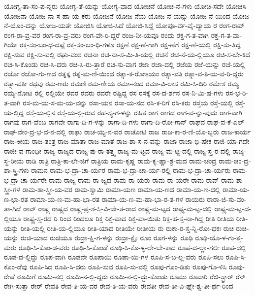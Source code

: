 {ಯೋಗ್ಯ-ತಾ-ಸಂ-ಪ-ನ್ನರು
ಯೋಗ್ಯ-ತೆ-ಯನ್ನು
ಯೋಗ್ಯ-ವಾದ
ಯೋಚನೆ
ಯೋಚ-ನೆ-ಗಳು
ಯೋಚಿ-ಸದೇ
ಯೋಚಿಸಿ
ಯೋಜನಾ
ಯೋಜ-ನಾ-ಸ-ಹಾ-ಯ-ಕರು
ಯೋಜನೆ
ಯೋಜ-ನೆಯ
ಯೋಜ-ನೆ-ಯನ್ನು
ಯೋಜ-ನೆ-ಯಿಂದ
ಯೋಜ-ನೆ-ಯೊಂ-ದನ್ನು
ಯೋಜ-ಯತೇ
ಯೋಜಿಸಿ
ಯೋಜಿ-ಸಿದೆ
ಯೋಜಿ-ಸಿದ್ದೆ
ಯೋಪೂ-ರ್ವ-ವೈ-ದ್ಯಾಯ
ರ
ರಂಗ-ರಾವ್
ರಂಗ-ರಾ-ವ್ರ-ವರ
ರಂಗ-ರಾ-ವ್ರ-ವರು
ರಂಗ-ವೇ-ರಿ-ದ್ದರೆ
ರಂಜ-ನೀ-ಯವೂ
ರಂದು
ರಕ್ತ-ಗ-ತ-ವಾಗಿ
ರಕ್ತ-ಗ-ತ-ವಾ-ಗಿಯೇ
ರಕ್ತ-ಸಂ-ಬಂ-ಧ-ದಷ್ಟೆ
ರಕ್ತ-ಸಂ-ಬಂ-ಧಿ-ಗಳೂ
ರಕ್ಷಣೆ
ರಕ್ಷ-ಣೆ-ಗಾಗಿ
ರಕ್ಷ-ಣೆಗೆ
ರಕ್ಷ-ಣೆ-ಯಲ್ಲಿ
ರಕ್ಷಿ-ಸು-ತ್ತಿದ್ದ
ರಕ್ಷಿ-ಸುವ
ರಕ್ಷಿ-ಸು-ವಲ್ಲಿ
ರಘು-ವಂಶ
ರಚನಾ
ರಚ-ನಾ-ಸ-ಮಿ-ತಿ-ಯಲ್ಲಿ
ರಚನೆ
ರಚ-ನೆ-ಯ-ಲ್ಲಿಯೂ
ರಚಿ-ಸ-ಬೇ-ಕಿದೆ
ರಚಿ-ಸಿ-ಕೊಂಡು
ರಚಿ-ಸಿ-ದರು
ರಚಿ-ಸಿ-ರು-ತ್ತಾರೆ
ರಚಿ-ಸು-ವಾಗ
ರಜಾ
ರಜಾ-ದಲ್ಲಿ
ರಜೆಯ
ರಜೆ-ಯನ್ನು
ರಜೆ-ಯಲ್ಲಿ
ರಜೋ
ರಜೋ-ಗು-ಣದ
ರತ್ನಕ್ಕ
ರತ್ನ-ಮ-ಣಿ-ಯಿಂದ
ರತ್ನಾ-ಕ-ರೋಽಯಂ
ರತ್ನಾ-ವತಿ
ರತ್ನಾ-ವ-ತಿ-ಯ-ವ-ರಿ-ದ್ದರು
ರತ್ನಾ-ವತೀ
ರಥವು
ರಮ-ಣರು
ರಮಣಿ
ರಮ-ಣೀಯ
ರಮಾ-ನಂದ
ರಮಾ-ವಿ-ಲಾಸ
ರಮಿ-ಸಿ-ದಿರಿ
ರಮೇಶ
ರಮ್ಯ
ರಮ್ಯ-ನೋಟ
ರಲ್ಲಿ
ರಲ್ಲಿಯೇ
ರವರ
ರವರು
ರವರೇ
ರಷ್ಟಿದ್ದ
ರಸ
ರಸಕ್ಕೆ
ರಸ-ದ-ರ್ಶನ
ರಸ-ನಿ-ಮಿ-ಷ-ಗಳು
ರಸ-ಭ-ರಿ-ತ-ವಾಗಿ
ರಸ-ಮ-ಯ-ಸ-ಮ-ಯ-ವನ್ನು
ರಸಾ-ಯನ
ರಸಾ-ಯ-ನದ
ರಸಿ-ಕ-ರಿಗೆ
ರಸಿ-ಕರು
ರಸ್ತೆಯ
ರಸ್ತೆ-ಯಲ್ಲಿ
ರಸ್ತೆ-ಯ-ಲ್ಲಿದ್ದ
ರಸ್ತೆ-ಯ-ಲ್ಲಿನ
ರಸ್ತೆ-ಯ-ಲ್ಲಿ-ರುವ
ರಹ-ಸ್ಯ-ಗ-ಳನ್ನು
ರಹಿತ
ರಾಗ
ರಾಗದ
ರಾಗ-ವ-ನ್ನು-ವುದು
ರಾಗ-ವಾಗಿ
ರಾಗವು
ರಾಗ-ವೆಂಬ
ರಾಗವೇ
ರಾಗಾ-ದಿ-ಗ-ಳನ್ನು
ರಾಗಾ-ದಿ-ಗಳು
ರಾಗಾ-ದಿ-ರೋ-ಗಾನ್
ರಾಘವ
ರಾಘ-ವ-ಕೆ-ಎಲ್
ರಾಘ-ವೇಂ-ದ್ರ-ಭ-ವ-ನ-ದಲ್ಲಿ
ರಾಘು
ರಾಚ-ಯ್ಯ-ನ-ವರ
ರಾಚೋಟಿ
ರಾಜ
ರಾಜ-ಕಾ-ರ-ಣಿ-ಯೊ-ಬ್ಬರು
ರಾಜ-ಕಾರ್ಯ
ರಾಜ-ಕೀಯ
ರಾಜ-ತಂತ್ರ
ರಾಜ-ಮಾತಾ
ರಾಜ-ಮಾತೆ
ರಾಜ-ಶಾ-ಸ-ನ-ವನ್ನು
ರಾಜಾ
ರಾಜಾ-ಭಿ-ಷೇಕ
ರಾಜಿ-ಯಾ-ಗದೇ
ರಾಜೀ-ವ-ಗಾಂಧೀ
ರಾಜ್ಯ
ರಾಜ್ಯದ
ರಾಜ್ಯ-ಪು-ರಾ-ತತ್ತ್ವ
ರಾಜ್ಯ-ಮ-ಟ್ಟದ
ರಾಜ್ಯ-ಮ-ಟ್ಟ-ದಲ್ಲಿ
ರಾಜ್ಯ-ಸ್ತ-ರ-ದಲ್ಲಿ
ರಾಜ್ಯ-ಸ್ಥ-ರೀಯ
ರಾಡಿ
ರಾತ್ರಿ
ರಾತ್ರಿ-ಕಾ-ಲೇ-ಜಿಗೆ
ರಾತ್ರಿಯ
ರಾಮ-ಕೃಷ್ಣ
ರಾಮ-ಕೃ-ಷ್ಣಾ-ಶ್ರ-ಮದ
ರಾಮ-ಚಂದ್ರ
ರಾಮ-ಚಂ-ದ್ರ-ಶಾ-ಸ್ತ್ರಿ-ಗಳು
ರಾಮನ
ರಾಮ-ಭ-ದ್ರಾ-ಚಾ-ರ್ಯರ
ರಾಮ-ಭ-ದ್ರಾ-ಚಾ-ರ್ಯ-ರಲ್ಲಿ
ರಾಮ-ಭ-ದ್ರಾ-ಚಾ-ರ್ಯರು
ರಾಮ-ಭ-ದ್ರಾ-ಚಾ-ರ್ಯರೇ
ರಾಮ-ರಾಜ್ಯ
ರಾಮ-ರಾ-ಜ್ಯದ
ರಾಮ-ರಾ-ಯರು
ರಾಮ-ರಾ-ಯರೇ
ರಾಮ-ರಾವ್
ರಾಮ-ಶಾ-ಸ್ತ್ರೀ-ಗಳ
ರಾಮ-ಶಾ-ಸ್ತ್ರೀ-ಯ-ವರ
ರಾಮ-ಸ್ವಾಮಿ
ರಾಮಾ-ಯಣ
ರಾಮಾ-ಯ-ಣದ
ರಾಮಾ-ಯ-ಣ-ದಲ್ಲಿ
ರಾಮಾ-ಯ-ಣ-ಭಾ-ರತ
ರಾಮಾ-ಯ-ಣ-ಮ-ಹಾ-ಭಾ-ರತ
ರಾಮಾ-ಯ-ಣ-ಮ-ಹಾ-ಭಾ-ರ-ತ-ಗಳ
ರಾಯರು
ರಾರಾ-ಜಿ-ಸು-ವಂ-ತಾ-ಗಿದೆ
ರಾವ್
ರಾಷ್ಟ್ರ
ರಾಷ್ಟ್ರದ
ರಾಷ್ಟ್ರ-ಪ್ರ-ಶ-ಸ್ತಿ-ವಿ-ಜೇ-ತ-ರಾದ
ರಾಷ್ಟ್ರ-ಮ-ಟ್ಟದ
ರಾಷ್ಟ್ರ-ಮ-ಟ್ಟ-ದಲ್ಲಿ
ರಾಷ್ಟ್ರ-ಮ-ಟ್ಟ-ದ-ಲ್ಲಿಯೂ
ರಾಷ್ಟ್ರ-ಸ್ತ-ರದ
ರಿ
ರಿಂದ
ರಿಂದಲೂ
ರಿಕ್ತ
ರಿಕ್ತ-ವಾದ
ರಿಕ್ತ-ವಾ-ಯಿತು
ರಿಕ್ತ-ಹ-ಸ್ತ-ನಾ-ಗಿದ್ದ
ರೀತಿ
ರೀತಿಯ
ರೀತಿ-ಯನ್ನು
ರೀತಿ-ಯಲ್ಲಿ
ರೀತಿ-ಯ-ಲ್ಲಿಯೂ
ರೀತಿ-ಯಾದ
ರೀತಿಯೇ
ರೀತೀಯ
ರು
ರುಕಾ-ರ-ಸ್ತ-ನ್ನಿ-ರೋ-ಧಕಃ
ರುಚಿ
ರುಚಿ-ಯನ್ನು
ರುಚಿ-ಯಾದ
ರುಚಿಯೂ
ರುದ್ರಾ-ಕ್ಷಿ-ಗ-ಳನ್ನು
ರುದ್ರಾ-ಕ್ಷೈಃ
ರೂಂ
ರೂಗ-ಳನ್ನು
ರೂಢಿ
ರೂಢಿ-ಯೊ-ಳ-ಗು-ತ್ತ-ಮರು
ರೂಢಿ-ಸಿ-ಕೊಂ-ಡ-ವರು
ರೂಢಿ-ಸಿ-ಕೊಂಡೆ
ರೂಢಿ-ಸಿ-ಕೊ-ಳ್ಳ-ಲೇ-ಬೇ-ಕಾದ
ರೂಪ-ದ-ಲ್ಲಾ-ಗಲೀ
ರೂಪ-ದಲ್ಲಿ
ರೂಪ-ದ-ಲ್ಲಿದ್ದು
ರೂಪ-ವಾಗಿ
ರೂಪವೇ
ರೂಪಾಯಿ
ರೂಪಾ-ಯಿ-ಗಳ
ರೂಪಿ-ಸ-ಬ-ಲ್ಲ-ವರು
ರೂಪಿ-ಸಲು
ರೂಪಿ-ಸಿ-ಕೊಂ-ಡೆವು
ರೂಪಿ-ಸಿದ
ರೂಪಿ-ಸಿ-ದರು
ರೂಪಿ-ಸುವ
ರೂಪಿ-ಸು-ವಲ್ಲಿ
ರೂಪು-ಗೊಂ-ಡಿತು
ರೂಪು-ಗೊ-ಳಿಸಿ
ರೂಪು-ರೇಷೆ
ರೂಮಿಗೆ
ರೂಮಿ-ನಲ್ಲಿ
ರೂಮಿ-ನ-ಲ್ಲಿ-ದ್ದರು
ರೂಮಿ-ನ-ಲ್ಲಿ-ದ್ದು-ಕೊಂಡು
ರೂಮು
ರೂವಾರಿ
ರೆಜಿ-ಸ್ಟ್ರಾರ್
ರೆನ್
ರೇಗಿ-ಸುತ್ತಾ
ರೇರ್
ರೇವತಿ
ರೇವ-ತಿ-ಯ-ವರ
ರೇವ-ತಿ-ಯ-ವರು
ರೇವತೀ
ರೇವ-ತೀ-ವಿ-ಘ್ನೇ-ಶ್ವ-ತೀ-ರ್ಥ-ರಿಂದ
}
